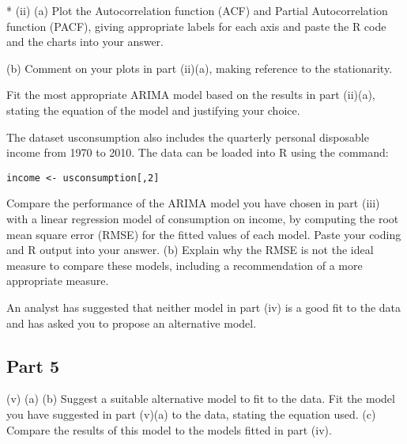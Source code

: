 \documentclass[a4paper,12pt]{article}
\begin{document}
\newpage 
* (ii) (a) Plot the Autocorrelation function (ACF) and Partial Autocorrelation function (PACF), giving appropriate labels for each axis and paste the
R code and the charts into your answer.

(b) Comment on your plots in part (ii)(a), making reference to the stationarity.



Fit the most appropriate ARIMA model based on the results in part (ii)(a),
stating the equation of the model and justifying your choice.



\newpage 
The dataset usconsumption also includes the quarterly personal disposable income from 1970 to 2010. 
The data can be loaded into R using the command:



\begin{framed} \begin{verbatim}
income <- usconsumption[,2]
\end{verbatim}\end{framed}


Compare the performance of the ARIMA model you have chosen in part (iii) with a linear regression model of consumption on income, by computing the root mean square error (RMSE) for the fitted values of
each model. Paste your coding and R output into your answer.
(b)
Explain why the RMSE is not the ideal measure to compare these models, including a recommendation of a more appropriate measure.


An analyst has suggested that neither model in part (iv) is a good fit to the data and has asked you to propose an alternative model.

\newpage 
\subsection*{Part 5}
(v)
(a)
(b)
Suggest a suitable alternative model to fit to the data. Fit the model you have suggested in part (v)(a) to the data, stating the
equation used.
(c)
Compare the results of this model to the models fitted in part (iv).
\end{document}
